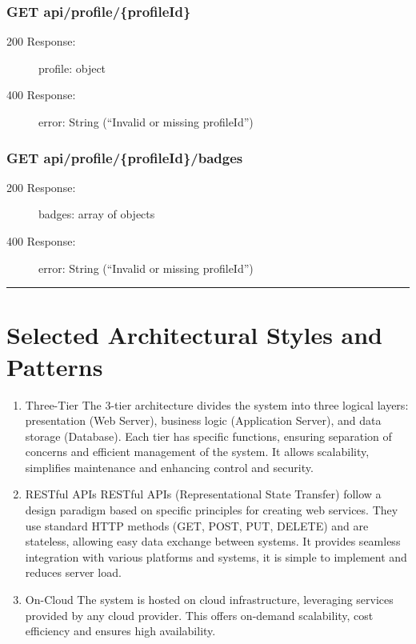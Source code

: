 \documentclass{Configuration_Files/Template}
\begin{document}
\subsubsection{GET api/profile/\{profileId\}}
\begin{description}
    \item[200 Response:] profile: object
    \item[400 Response:] error: String (“Invalid or missing profileId”)
\end{description}

\subsubsection{GET api/profile/\{profileId\}/badges}
\begin{description}
    \item[200 Response:] badges: array of objects
    \item[400 Response:] error: String (“Invalid or missing profileId”)
\end{description}

{\color{bluepoli}\rule{\linewidth}{0.1pt}}

\section{Selected Architectural Styles and Patterns}

\begin{enumerate}
    \item \textcolor{bluepoli}{Three-Tier} The 3-tier architecture divides the system into three logical layers: presentation (Web Server), business logic (Application Server), and data storage (Database). Each tier has specific functions, ensuring separation of concerns and efficient management of the system. It allows scalability, simplifies maintenance and enhancing control and security. 
    \item \textcolor{bluepoli}{RESTful APIs} RESTful APIs (Representational State Transfer) follow a design paradigm based on specific principles for creating web services. They use standard HTTP methods (GET, POST, PUT, DELETE) and are stateless, allowing easy data exchange between systems. It provides seamless integration with various platforms and systems, it is simple to implement and reduces server load.
    \item \textcolor{bluepoli}{On-Cloud} The system is hosted on cloud infrastructure, leveraging services provided by any cloud provider. This offers on-demand scalability, cost efficiency and ensures high availability.
\end{enumerate}
\end{document}
